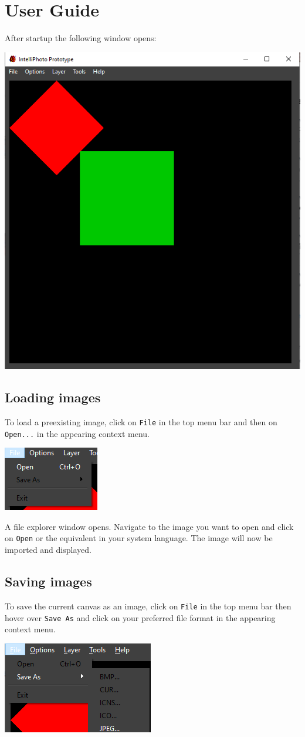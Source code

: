 \documentclass[a4paper, 12pt]{article}
\begin{document}
\section{User Guide}
After startup the following window opens:
\begin{center}
\includegraphics[width=0.5\linewidth,keepaspectratio]{assets/startup}
\end{center}

\subsection{Loading images}
To load a preexisting image, click on \texttt{File} in the top menu bar and then on \texttt{Open...} in the appearing context menu.
\begin{center}
\includegraphics[width=0.3\linewidth,keepaspectratio]{assets/file-open}
\end{center}

A file explorer window opens. Navigate to the image you want to open and click on \texttt{Open} or the equivalent in your system language. The image will now be imported and displayed.

\subsection{Saving images}
To save the current canvas as an image, click on \texttt{File} in the top menu bar then hover over \texttt{Save As} and click on your preferred file format in the appearing context menu.
\begin{center}
\includegraphics[width=0.3\linewidth,keepaspectratio]{assets/file-save}
\end{center}
\end{document}
